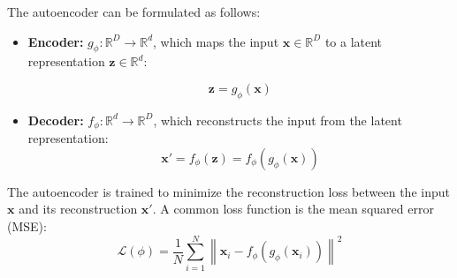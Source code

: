 \documentclass{article}
\begin{document}
The autoencoder can be formulated as follows:
\begin{itemize}
  \item \textbf{Encoder:} \( g_{\phi}: \mathbb{R}^D \rightarrow \mathbb{R}^d \), which maps the input \( \mathbf{x} \in \mathbb{R}^D \) to a latent representation \( \mathbf{z} \in \mathbb{R}^d \):
  
  \begin{equation}
      \mathbf{z} = g_{\phi}(\mathbf{x})
  \end{equation}
  
  \item \textbf{Decoder:} \( f_{\phi}: \mathbb{R}^d \rightarrow \mathbb{R}^D \), which reconstructs the input from the latent representation:
  \begin{equation}
    \mathbf{x}' = f_{\phi}(\mathbf{z}) = f_{\phi}(g_{\phi}(\mathbf{x}))
  \end{equation}
\end{itemize}




The autoencoder is trained to minimize the reconstruction loss between the input \( \mathbf{x} \) and its reconstruction \( \mathbf{x}' \). A common loss function is the mean squared error (MSE):
\begin{equation}
    \mathcal{L}(\phi) = \frac{1}{N} \sum_{i=1}^N \left\| \mathbf{x}_i - f_{\phi}(g_{\phi}(\mathbf{x}_i)) \right\|^2
\end{equation}
\end{document}
